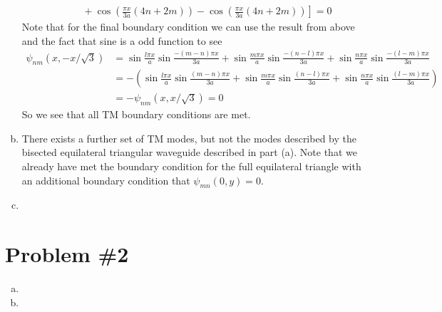 \documentclass[11pt]{article}
\numberwithin{equation}{section}
\begin{document}
\begin{enumerate}[(a)]
\begin{align*}
        &\qquad+\left.\cos\left(\frac{\pi{x}}{3a}(4n+2m)\right) - \cos\left(\frac{\pi{x}}{3a}(4n+2m)\right)\right]= 0
    \end{align*}
    Note that for the final boundary condition we can use the result from above and the fact
    that sine is a odd function to see
    \begin{align*}
        \psi_{nm}(x,-x/\sqrt{3}) &= \sin\frac{l\pi{x}}{a}\sin\frac{-(m-n)\pi{x}}{3a}
            + \sin\frac{m\pi{x}}{a}\sin\frac{-(n-l)\pi{x}}{3a}
            + \sin\frac{n\pi{x}}{a}\sin\frac{-(l-m)\pi{x}}{3a}\\
        &= -\left(\sin\frac{l\pi{x}}{a}\sin\frac{(m-n)\pi{x}}{3a}
            + \sin\frac{m\pi{x}}{a}\sin\frac{(n-l)\pi{x}}{3a}
            + \sin\frac{n\pi{x}}{a}\sin\frac{(l-m)\pi{x}}{3a}\right)\\
        &= -\psi_{nm}(x,x/\sqrt{3}) = 0
    \end{align*}
    So we see that all TM boundary conditions are met.

\item
    There exists a further set of TM modes, but not the modes described by the bisected 
    equilateral triangular waveguide described in part (a). Note that we already have met the
    boundary condition for the full equilateral triangle with an additional boundary 
    condition that $\psi_{mn}(0,y) = 0$.

   

\item
\end{enumerate}

\pagebreak

\section{Problem \#2}
\begin{enumerate}[(a)]
\item
\item
\end{enumerate}
\end{document}
